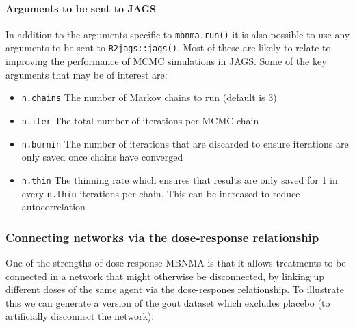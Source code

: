 \documentclass[]{article}
\newenvironment{Shaded}{\begin{snugshade}}{\end{snugshade}}
\newcommand{\CommentTok}[1]{\textcolor[rgb]{0.56,0.35,0.01}{\textit{#1}}}
\newcommand{\DecValTok}[1]{\textcolor[rgb]{0.00,0.00,0.81}{#1}}
\newcommand{\KeywordTok}[1]{\textcolor[rgb]{0.13,0.29,0.53}{\textbf{#1}}}
\newcommand{\NormalTok}[1]{#1}
\newcommand{\OperatorTok}[1]{\textcolor[rgb]{0.81,0.36,0.00}{\textbf{#1}}}
\newcommand{\StringTok}[1]{\textcolor[rgb]{0.31,0.60,0.02}{#1}}
\providecommand{\tightlist}{%
  \setlength{\itemsep}{0pt}\setlength{\parskip}{0pt}}
\let\oldparagraph\paragraph
\renewcommand{\paragraph}[1]{\oldparagraph{#1}\mbox{}}
\begin{document}
\hypertarget{arguments-to-be-sent-to-jags}{%
\paragraph{Arguments to be sent to
JAGS}\label{arguments-to-be-sent-to-jags}}

In addition to the arguments specific to \texttt{mbnma.run()} it is also
possible to use any arguments to be sent to \texttt{R2jags::jags()}.
Most of these are likely to relate to improving the performance of MCMC
simulations in JAGS. Some of the key arguments that may be of interest
are:

\begin{itemize}
\tightlist
\item
  \texttt{n.chains} The number of Markov chains to run (default is 3)
\item
  \texttt{n.iter} The total number of iterations per MCMC chain
\item
  \texttt{n.burnin} The number of iterations that are discarded to
  ensure iterations are only saved once chains have converged
\item
  \texttt{n.thin} The thinning rate which ensures that results are only
  saved for 1 in every \texttt{n.thin} iterations per chain. This can be
  increased to reduce autocorrelation
\end{itemize}

\hypertarget{connecting-networks-via-the-dose-response-relationship}{%
\subsubsection{Connecting networks via the dose-response
relationship}\label{connecting-networks-via-the-dose-response-relationship}}

One of the strengths of dose-response MBNMA is that it allows treatments
to be connected in a network that might otherwise be disconnected, by
linking up different doses of the same agent via the dose-respones
relationship. To illustrate this we can generate a version of the gout
dataset which excludes placebo (to artificially disconnect the network):

\begin{Shaded}
\end{Shaded}
\end{document}
